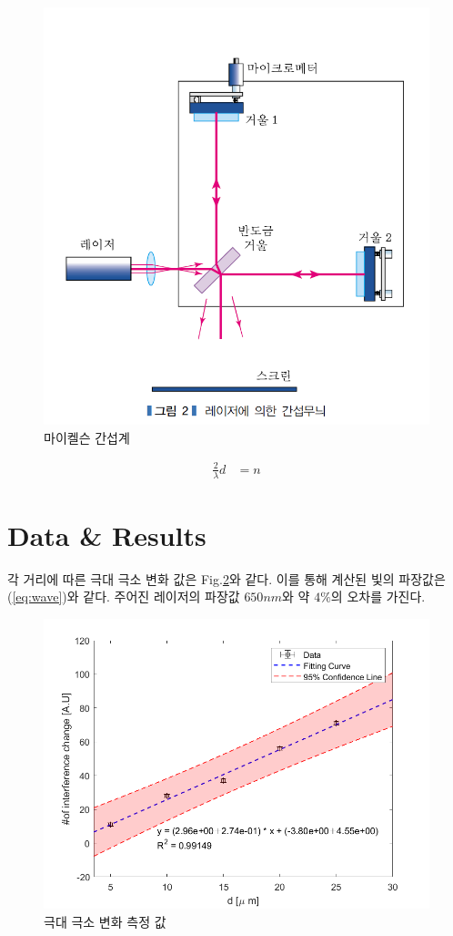 \documentclass[%
 reprint,
 amsmath,amssymb,
 aps,
]{revtex4-2}
\begin{document}
\begin{figure}[h]
    \centering
    \includegraphics[width=0.8\linewidth]{Michelson.png}
    \caption{\label{fig:Michelsonl} 마이켈슨 간섭계}
\end{figure}

\begin{align}
	\frac{2}{\lambda}d &= n
\end{align}

\section{\label{sec:level1}Data \& Results}
각 거리에 따른 극대 극소 변화 값은 Fig.\ref{fig:data}와 같다. 이를 통해 계산된 빛의 파장값은 (\ref{eq:wave})와 같다. 주어진 레이저의 파장값 $650nm$와 약 $4\%$의 오차를 가진다.

\begin{figure}[h]
    \centering
    \includegraphics[width=0.95\linewidth]{data.png}
    \caption{\label{fig:data} 극대 극소 변화 측정 값}
\end{figure}
\end{document}
